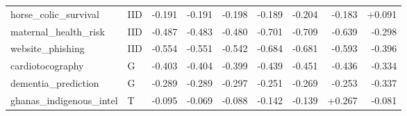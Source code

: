 \begin{longtable}{@{}p{3.95cm}lrrrrrrr@{}}
horse\_\allowbreak{}colic\_\allowbreak{}survival & IID & -0.191 & -0.191 & -0.198 & -0.189 & -0.204 & -0.183 & +0.091\\
maternal\_\allowbreak{}health\_\allowbreak{}risk & IID & -0.487 & -0.483 & -0.480 & -0.701 & -0.709 & -0.639 & -0.298\\
website\_\allowbreak{}phishing & IID & -0.554 & -0.551 & -0.542 & -0.684 & -0.681 & -0.593 & -0.396\\
cardiotocography & G & -0.403 & -0.404 & -0.399 & -0.439 & -0.451 & -0.436 & -0.334\\
dementia\_\allowbreak{}prediction & G & -0.289 & -0.289 & -0.297 & -0.251 & -0.269 & -0.253 & -0.337\\
ghanas\_\allowbreak{}indigenous\_\allowbreak{}intel & T & -0.095 & -0.069 & -0.088 & -0.142 & -0.139 & +0.267 & -0.081\\
\end{longtable}\endgroup
\begingroup\footnotesize\setlength{\tabcolsep}{3pt}\renewcommand{\arraystretch}{1.15}
\setlength\LTleft{0pt}\setlength\LTright{0pt}
